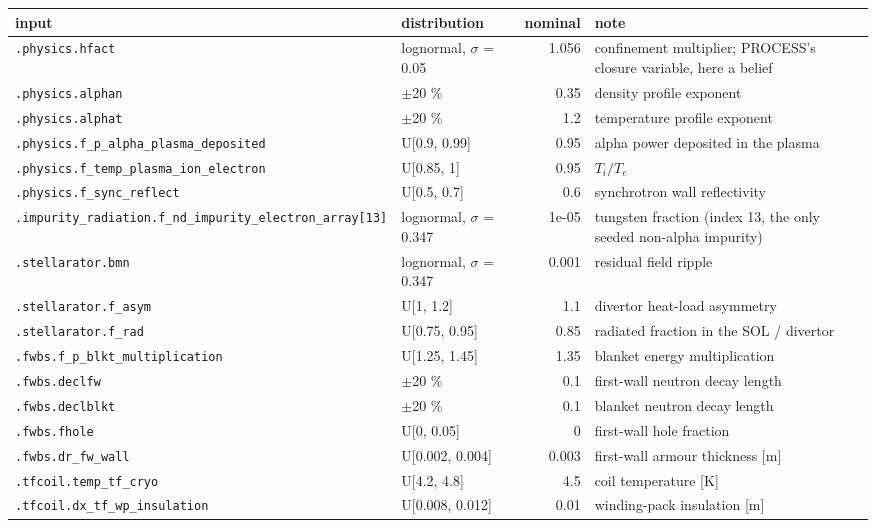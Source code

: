 \begin{tabular}{llrl}
\toprule
input & distribution & nominal & note \\
\midrule
\texttt{.physics.hfact} & lognormal, $\sigma$ = 0.05 & 1.056 & confinement multiplier; PROCESS's closure variable, here a belief \\
\texttt{.physics.alphan} & $\pm$20 \% & 0.35 & density profile exponent \\
\texttt{.physics.alphat} & $\pm$20 \% & 1.2 & temperature profile exponent \\
\texttt{.physics.f\_p\_alpha\_plasma\_deposited} & U[0.9, 0.99] & 0.95 & alpha power deposited in the plasma \\
\texttt{.physics.f\_temp\_plasma\_ion\_electron} & U[0.85, 1] & 0.95 & $T_i / T_e$ \\
\texttt{.physics.f\_sync\_reflect} & U[0.5, 0.7] & 0.6 & synchrotron wall reflectivity \\
\texttt{.impurity\_radiation.f\_nd\_impurity\_electron\_array[13]} & lognormal, $\sigma$ = 0.347 & 1e-05 & tungsten fraction (index 13, the only seeded non-alpha impurity) \\
\texttt{.stellarator.bmn} & lognormal, $\sigma$ = 0.347 & 0.001 & residual field ripple \\
\texttt{.stellarator.f\_asym} & U[1, 1.2] & 1.1 & divertor heat-load asymmetry \\
\texttt{.stellarator.f\_rad} & U[0.75, 0.95] & 0.85 & radiated fraction in the SOL / divertor \\
\texttt{.fwbs.f\_p\_blkt\_multiplication} & U[1.25, 1.45] & 1.35 & blanket energy multiplication \\
\texttt{.fwbs.declfw} & $\pm$20 \% & 0.1 & first-wall neutron decay length \\
\texttt{.fwbs.declblkt} & $\pm$20 \% & 0.1 & blanket neutron decay length \\
\texttt{.fwbs.fhole} & U[0, 0.05] & 0 & first-wall hole fraction \\
\texttt{.fwbs.dr\_fw\_wall} & U[0.002, 0.004] & 0.003 & first-wall armour thickness [m] \\
\texttt{.tfcoil.temp\_tf\_cryo} & U[4.2, 4.8] & 4.5 & coil temperature [K] \\
\texttt{.tfcoil.dx\_tf\_wp\_insulation} & U[0.008, 0.012] & 0.01 & winding-pack insulation [m] \\

\end{tabular}
